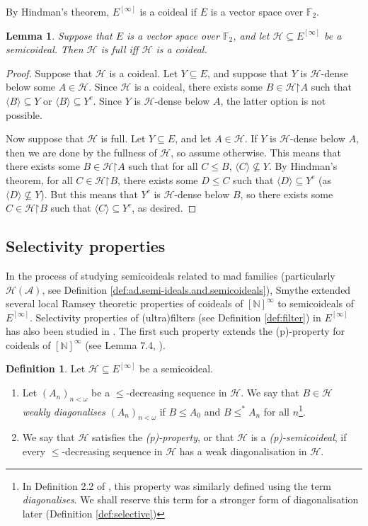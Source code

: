 \documentclass[11pt,reqno]{amsart}
\theoremstyle{plain}
\numberwithin{equation}{section}
\newtheorem{lemma}[theorem]{Lemma}
\theoremstyle{definition}
\newtheorem{definition}[theorem]{Definition}
\renewcommand{\c}[1]{\langle #1 \rangle}
\newcommand{\N}{\mathbb{N}}
\newcommand{\cal}{\mathcal}
\newcommand{\A}{\cal{A}}
\newcommand{\restrictedto}{\mathord{\upharpoonright}}
\renewcommand{\H}{\cal{H}}
\begin{document}
By Hindman's theorem, $E^{[\infty]}$ is a coideal if $E$ is a vector space over $\mathbb{F}_2$.

\begin{lemma}
\label{lem:full.iff.coideal}
    Suppose that $E$ is a vector space over $\mathbb{F}_2$, and let $\H \subseteq E^{[\infty]}$ be a semicoideal. Then $\H$ is full iff $\H$ is a coideal.
\end{lemma}

\begin{proof}
    Suppose that $\H$ is a coideal. Let $Y \subseteq E$, and suppose that $Y$ is $\H$-dense below some $A \in \H$. Since $\H$ is a coideal, there exists some $B \in \H\restrictedto A$ such that $\c{B} \subseteq Y$ or $\c{B} \subseteq Y^c$. Since $Y$ is $\H$-dense below $A$, the latter option is not possible.

    Now suppose that $\H$ is full. Let $Y \subseteq E$, and let $A \in \H$. If $Y$ is $\H$-dense below $A$, then we are done by the fullness of $\H$, so assume otherwise. This means that there exists some $B \in \H\restrictedto A$ such that for all $C \leq B$, $\c{C} \not\subseteq Y$. By Hindman's theorem, for all $C \in \H\restrictedto B$, there exists some $D \leq C$ such that $\c{D} \subseteq Y^c$ (as $\c{D} \not\subseteq Y$). But this means that $Y^c$ is $\H$-dense below $B$, so there exists some $C \in \H\restrictedto B$ such that $\c{C} \subseteq Y^c$, as desired.
\end{proof}

\subsection{Selectivity properties}
In the process of studying semicoideals related to mad families (particularly $\H(\A)$, see Definition \ref{def:ad.semi-ideals.and.semicoideals}), Smythe extended several local Ramsey theoretic properties of coideals of $[\N]^\infty$ to semicoideals of $E^{[\infty]}$. Selectivity properties of (ultra)filters (see Definition \ref{def:filter}) in $E^{[\infty]}$ has also been studied in \cite{S23}.  The first such property extends the (p)-property for coideals of $[\N]^\infty$ (see Lemma 7.4, \cite{T10}).

\begin{definition}
\label{def:(p)-semicoideal}
    Let $\H \subseteq E^{[\infty]}$ be a semicoideal.
    \begin{enumerate}
        \item Let $(A_n)_{n<\omega}$ be a $\leq$-decreasing sequence in $\H$. We say that $B \in \H$ \emph{weakly diagonalises} $(A_n)_{n<\omega}$ if $B \leq A_0$ and $B \leq^* A_n$ for all $n$\footnote{In Definition 2.2 of \cite{S18}, this property was similarly defined using the term \emph{diagonalises}. We shall reserve this term for a stronger form of diagonalisation later (Definition \ref{def:selective})}.

        \item We say that $\H$ satisfies the \emph{(p)-property}, or that $\H$ is a \emph{(p)-semicoideal}, if every $\leq$-decreasing sequence in $\H$ has a weak diagonalisation in $\H$.
    \end{enumerate}
\end{definition}
\end{document}
